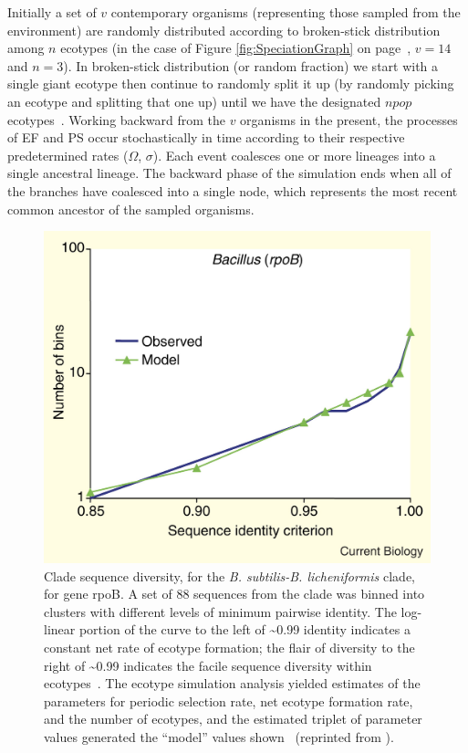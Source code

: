 Initially a set of $v$ contemporary organisms (representing those sampled from the environment) are randomly distributed according to broken-stick distribution among $n$ ecotypes (in the case of Figure \ref{fig:SpeciationGraph} on page~\pageref{fig:SpeciationGraph}, $v = 14$ and $n = 3$).
In broken-stick distribution (or random fraction) we start with a single giant ecotype then continue to randomly split it up (by randomly picking an ecotype and splitting that one up) until we have the designated $npop$ ecotypes~\cite{tokeshi1990niche}.
Working backward from the $v$ organisms in the present, the processes of EF and PS occur stochastically in time according to their respective predetermined rates ($\Omega$, $\sigma$).
Each event coalesces one or more lineages into  a single ancestral lineage.
The backward phase of the simulation ends when all of the branches have coalesced into a single node, which represents the most recent common ancestor of the sampled organisms.

\begin{figure}[h!]
\centering
\includegraphics[scale=1.5]{images/TreeCompare-CH2}
\caption[Observed and simulated evolutionary histories.]{Clade sequence diversity, for the \emph{B. subtilis-B. licheniformis} clade, for gene rpoB. A set of 88 sequences from the clade was binned into clusters with different levels of minimum pairwise identity. The log-linear portion of the curve to the left of \textasciitilde0.99 identity indicates a constant net rate of ecotype formation; the flair of diversity to the right of \textasciitilde0.99 indicates the facile sequence diversity within ecotypes~\cite{acinas2004fine}. The ecotype simulation analysis yielded estimates of the parameters for periodic selection rate, net ecotype formation rate, and the number of ecotypes, and the estimated triplet of parameter values generated the ``model'' values shown~\cite{koeppel2008identifying} (reprinted from \protect\cite{cohan2007systematics}).}
\label{fig:TreeCompare}
\end{figure}

